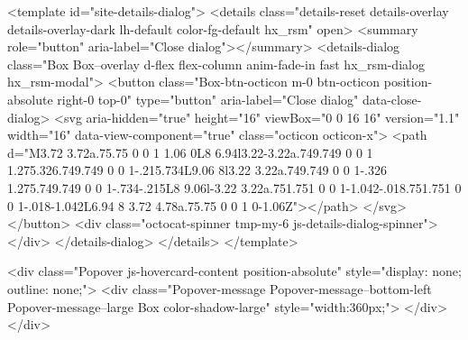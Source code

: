 {{{{{{{    <template id="site-details-dialog">
  <details class="details-reset details-overlay details-overlay-dark lh-default color-fg-default hx_rsm" open>
    <summary role="button" aria-label="Close dialog"></summary>
    <details-dialog class="Box Box--overlay d-flex flex-column anim-fade-in fast hx_rsm-dialog hx_rsm-modal">
      <button class="Box-btn-octicon m-0 btn-octicon position-absolute right-0 top-0" type="button" aria-label="Close dialog" data-close-dialog>
        <svg aria-hidden="true" height="16" viewBox="0 0 16 16" version="1.1" width="16" data-view-component="true" class="octicon octicon-x">
    <path d="M3.72 3.72a.75.75 0 0 1 1.06 0L8 6.94l3.22-3.22a.749.749 0 0 1 1.275.326.749.749 0 0 1-.215.734L9.06 8l3.22 3.22a.749.749 0 0 1-.326 1.275.749.749 0 0 1-.734-.215L8 9.06l-3.22 3.22a.751.751 0 0 1-1.042-.018.751.751 0 0 1-.018-1.042L6.94 8 3.72 4.78a.75.75 0 0 1 0-1.06Z"></path>
</svg>
      </button>
      <div class="octocat-spinner tmp-my-6 js-details-dialog-spinner"></div>
    </details-dialog>
  </details>
</template>

    <div class="Popover js-hovercard-content position-absolute" style="display: none; outline: none;">
  <div class="Popover-message Popover-message--bottom-left Popover-message--large Box color-shadow-large" style="width:360px;">
  </div>
</div>

}}}}}}}
